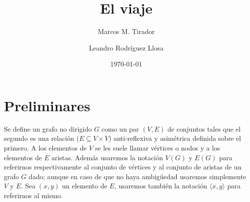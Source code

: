 \documentclass[10pt]{amsart}
\theoremstyle{definition}
\numberwithin{equation}{section}
\newcommand{\rr}{\mathbb{R}}
\begin{document}
	
	\mbox{}
	\title{El viaje}
	
	\author{Marcos M. Tirador}
	\address{Facultad de Matem\'atica y Computaci\'on \\ Universidad de La Habana \\ Ciudad de La Habana \\ Cuba}
	
	
	\author{Leandro Rodr\'iguez Llosa}
	\address{Facultad de Matem\'atica y Computaci\'on \\ Universidad de La Habana \\ Ciudad de La Habana \\ Cuba}
		

\date{\today}


\bigskip
\maketitle


\bigskip
\section{Preliminares}
Se define un grafo no dirigido $G$ como un par $(V,E)$ de conjuntos tales que el segundo es una relaci\'on ($E\subseteq V \times V$) anti-reflexiva y asim\'etrica definida sobre el primero. A los elementos de $V$ se les suele llamar v\'ertices o nodos y a los elementos de $E$ aristas. Adem\'as usaremos la notaci\'on $V(G)$ y $E(G)$ para referirnos respectivamente al conjunto de v\'ertices y al conjunto de aristas  de un grafo $G$ dado; aunque en caso de que no haya ambig\"uedad usaremos simplemente $V$ y $E$. Sea $(x,y)$ un elemento de $E$, usaremos tambi\'en la notaci\'on $\langle x,y \rangle$ para referirnos al mismo.


\end{document}
